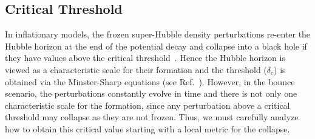 \documentclass[a4paper,11pt]{article}
\begin{document}
\subsection{Critical Threshold}

\label{critical_delta}
In inflationary models, the frozen super-Hubble density perturbations re-enter the Hubble horizon at the end of the potential decay and collapse into a black hole if they have values above the critical threshold~\cite{Martin2014}. Hence the Hubble horizon is viewed as a characteristic scale for their formation and the threshold ($\delta_c$) is obtained via the Minster-Sharp equations (see Ref.~\cite{Musco2019}). However, in the bounce scenario, the perturbations constantly evolve in time and there is not only one characteristic scale for the formation, since any perturbation above a critical threshold may collapse as they are not frozen. Thus, we must carefully analyze how to obtain this critical value starting with a local metric for the collapse. 
\end{document}
